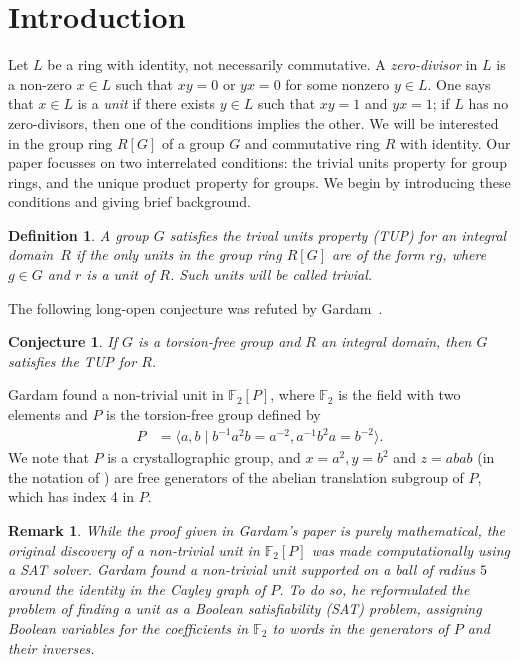 \documentclass[11pt]{amsart}
\theoremstyle{mythm}
\newtheorem{conjecture}[theorem]{Conjecture}
\theoremstyle{mydef}
\newtheorem{definition}[theorem]{Definition}
\theoremstyle{myrem}
\newtheorem{remark}[theorem]{Remark}
\numberwithin{equation}{section}
\begin{document}
\section{Introduction}\label{sec_intro} 
\noindent Let $L$ be a ring with identity, not necessarily commutative. A \emph{zero-divisor} in $L$ is a non-zero $x\in L$ such that $xy=0$ or $yx=0$ for some nonzero $y\in L$. 
One says that $x\in L$ is a \emph{unit}  if there exists $y\in L$ such that $xy=1$ and $yx=1$; if $L$ has no zero-divisors, then one of the conditions implies the other. We will be interested in the group ring $R[G]$ of a group $G$ and commutative ring $R$ with identity. Our paper focusses on two interrelated conditions: the trivial units property for group rings, and the unique product property for groups. We begin by introducing these conditions and giving brief background. 
\begin{definition} \label{df:TUP} A   group $G$ satisfies the \emph{trival units   property (TUP) for} an integral domain~$R$ if the only units in the group ring $R[G]$ are of the form $rg$, where $g\in G$ and $r $ is a unit of $R$. Such  units will be called  trivial.  \end{definition} 
The following long-open conjecture was refuted by Gardam~\cite{G}.
\begin{conjecture} \label{UC}
	If $G$ is a torsion-free group and $R$ an integral domain, then $G$ satisfies the TUP for $R$. 
\end{conjecture}
Gardam \cite{G} found   a non-trivial unit in $\mathbb{F}_2[P]$, where $\mathbb{F}_2$ is the field with two elements and $P$ is the torsion-free group defined by
\begin{align}\label{eq_P}P &= \langle a,b \mid b^{-1}a^2b = a^{-2}, a^{-1}b^{2}a=b^{-2}\rangle.
\end{align}
 We note that $P$ is a crystallographic group, and $x=a^2, y=b^2$ and $z=abab$ (in the notation of \cite{G}) are   free generators of the abelian translation subgroup of $P$, which has index 4 in $P$. 
\begin{remark} \label{rem:Gardam SAT}
	While the proof given in Gardam's paper is purely mathematical, the original discovery of a non-trivial unit in $\mathbb{F}_2[P]$ was made computationally using a SAT solver.   Gardam found   a  non-trivial unit supported on  a ball of radius $5$  around the identity in the Cayley graph of $P$. To do so, he  reformulated the problem of finding a unit as a Boolean satisfiability (SAT) problem, assigning Boolean variables for the coefficients in $\mathbb F_2$  to    words in the generators of $P$ and their inverses. 
\end{remark}
\end{document}

